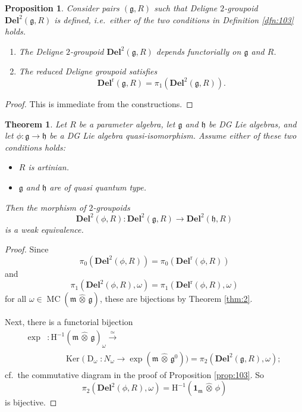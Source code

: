 \documentclass[a4paper,10pt]{amsart}
\newtheorem{thm}[equation]{Theorem}
\newtheorem{prop}[equation]{Proposition}
\theoremstyle{definition}
\numberwithin{equation}{section}
\newcommand{\iso}{\xrightarrow{\simeq}}
\newcommand{\opn}{\operatorname}
\newcommand{\rmitem}[1]{\item[\text{\textup{(#1)}}]}
\newcommand{\mfrak}[1]{\mathfrak{#1}}
\newcommand{\mbf}[1]{\mathbf{#1}}
\newcommand{\mrm}[1]{\mathrm{#1}}
\newcommand{\tup}[1]{\textup{#1}}
\newcommand{\bsym}[1]{\boldsymbol{#1}}
\newcommand{\what}[1]{\widehat{#1}}
\newcommand{\hatotimes}{\, \what{\otimes} \,}
\newcommand{\hot}{\hatotimes}
\newcommand{\g}{\mfrak{g}}
\newcommand{\m}{\mfrak{m}}
\newcommand{\h}{\mfrak{h}}
\newcommand{\om}{\omega}
\begin{document}
\begin{prop}
Consider pairs $(\g, R)$ such that Deligne $2$-groupoid $\mbf{Del}^2(\g, R)$
is defined, i.e.\ either of the two conditions in Definition \tup{\ref{dfn:103}}
holds. 
\begin{enumerate}
\item The Deligne $2$-groupoid $\mbf{Del}^2(\g, R)$ depends functorially on 
$\g$ and $R$. 

\item The reduced Deligne groupoid satisfies
\[ \mbf{Del}^{\mrm{r}}(\g, R) = \pi_1(\mbf{Del}^2(\g, R)) . \]
\end{enumerate}
\end{prop}

\begin{proof}
This is immediate from the constructions.
\end{proof}

\begin{thm} \label{thm:105}
Let $R$ be a parameter algebra, let $\g$ and $\h$ be
DG Lie algebras, and let $\phi : \g \to \h$ be a DG Lie algebra
quasi-isomorphism. Assume either of these two conditions holds:
\begin{itemize}
\rmitem{i} $R$ is artinian.  
\rmitem{ii} $\g$ and $\h$ are of quasi quantum type.
\end{itemize}  
Then the morphism of $2$-groupoids
\[ \mbf{Del}^2(\phi, R) : \mbf{Del}^2(\g, R) \to \mbf{Del}^2(\h, R) \]
is a weak equivalence.
\end{thm}

\begin{proof}
Since 
\[ \pi_0(\mbf{Del}^2(\phi, R)) = \pi_0(\mbf{Del}^{\mrm{r}}(\phi, R)) \]
and 
\[ \pi_1(\mbf{Del}^2(\phi, R), \om) = 
\pi_1(\mbf{Del}^{\mrm{r}}(\phi, R), \om) \]
for all $\om \in \opn{MC}(\m \hot \g)$,
these are bijections by Theorem \ref{thm:2}.

Next, there is a functorial bijection 
\begin{equation} \label{eqn:110}
\begin{aligned}
\exp & : \mrm{H}^{-1}(\m \hot \g)_{\om} \iso 
\\
& \qquad 
\opn{Ker} \bigl( \opn{D}_{\om} : N_{\om} \to \opn{exp}(\m \hot \g^0) \bigr) =
\pi_2(\mbf{Del}^2(\g, R), \om) ;
\end{aligned}
\end{equation}
cf.\ the commutative diagram in the proof of Proposition \ref{prop:103}. 
So 
\[ \pi_2(\mbf{Del}^2(\phi, R), \om) = 
\mrm{H}^{-1}(\bsym{1}_{\m} \hot \phi) \]
is bijective. 
\end{proof}
\end{document}
